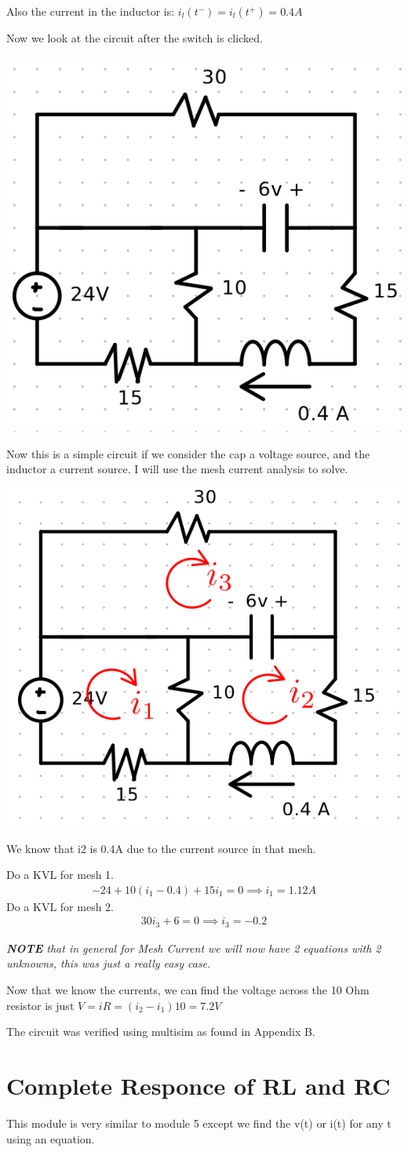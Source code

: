 \documentclass[12pt,letterpaper]{article} \usepackage{amsmath} \usepackage{graphicx} \usepackage[margin=1in]{geometry} \usepackage{longtable}  \usepackage{amssymb}
\begin{document}
\begin{mdframed}[]
	Also the current in the inductor is: $i_l(t^-)=i_l(t^+)=0.4A$
	
	Now we look at the circuit after the switch is clicked. 
	\begin{center}
		\includegraphics[width=0.3\linewidth]{ex3-3}
	\end{center}

	Now this is a simple circuit if we consider the cap a voltage source, and the inductor a current source. I will use the mesh current analysis to solve. 
	\begin{center}
		\includegraphics[width=0.3\linewidth]{ex3-4}
	\end{center}
	We know that i2 is 0.4A due to the current source in that mesh.
	
	Do a KVL for mesh 1.
	\begin{align*}
		-24+10(i_1-0.4)+15i_1 = 0 \implies i_1 = 1.12 A
	\end{align*}
	Do a KVL for mesh 2.
	\begin{align*}
		30i_3+6=0 \implies i_3 = -0.2
	\end{align*}

	\textit{\textbf{NOTE} that in general for Mesh Current we will now have 2 equations with 2 unknowns, this was just a really easy case.}
	
	Now that we know the currents, we can find the voltage across the 10 Ohm resistor is just $V=iR=(i_2-i_1)10=7.2 V$
	
	The circuit was verified using multisim as found in Appendix B.
	\end{mdframed}
	
	\section{Complete Responce of RL and RC}
	This module is very similar to module 5 except we find the v(t) or i(t) for any t using an equation. 
	
\end{document}
